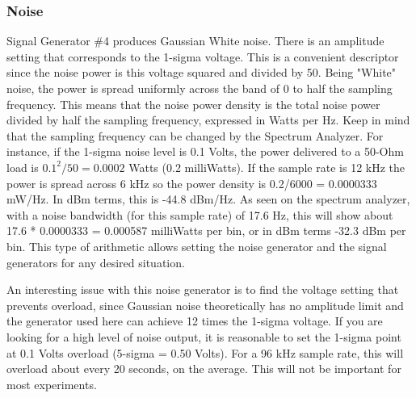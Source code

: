 \subsubsection{Noise}
\label{subsect:ASGNoise}
Signal  Generator \#4 produces Gaussian White noise.  There is an amplitude setting that corresponds to the 1-sigma voltage.  This is a convenient descriptor since the noise power is this voltage squared and divided by 50.  Being "White" noise, the power is spread uniformly across the band  of 0 to half the sampling frequency.  This means that the noise power density is the total noise power divided by half the sampling frequency,  expressed in Watts per Hz.  Keep in mind that the sampling frequency can be changed by the Spectrum Analyzer. For instance, if the 1-sigma noise level is 0.1 Volts, the power delivered to a 50-Ohm load is $0.1^2/50 = 0.0002$ Watts (0.2 milliWatts).   If the sample rate is 12 kHz the power is spread across 6 kHz so the power density is 0.2/6000 = 0.0000333 mW/Hz.  In dBm terms, this is -44.8 dBm/Hz.  As seen on the spectrum analyzer, with a noise bandwidth (for this sample rate) of 17.6 Hz, this will show about 17.6 * 0.0000333 = 0.000587 milliWatts per bin, or in dBm terms -32.3 dBm per bin.   This type of arithmetic allows setting the noise generator and the signal generators for any desired situation.

An interesting issue with this noise generator is to find the voltage setting that prevents overload, since Gaussian noise theoretically has no amplitude limit and the generator used here can achieve 12 times the 1-sigma voltage.  If you are looking for a high level of noise output, it is reasonable to set the 1-sigma point at 0.1 Volts overload (5-sigma = 0.50 Volts). For a 96 kHz sample rate, this will overload about every 20 seconds, on the average.  This will not be important for most experiments.
